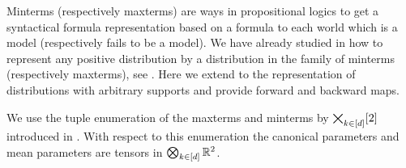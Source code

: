 
Minterms (respectively maxterms) are ways in propositional logics to get a syntactical formula representation based on a formula to each world which is a model (respectively fails to be a model).
We have already studied in  how to represent any positive distribution by a distribution in the family of minterms (respectively maxterms), see .
Here we extend to the representation of distributions with arbitrary supports and provide forward and backward maps.

We use the tuple enumeration of the maxterms and minterms by $\bigtimes_{k\in[d]}[2]$ introduced in .
With respect to this enumeration the canonical parameters and mean parameters are tensors in $\bigotimes_{k\in[d]}\mathbb{R}^2$.

